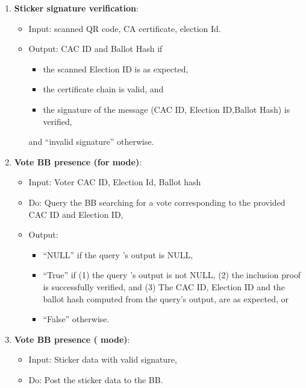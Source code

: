\documentclass{article}
\begin{document}
\begin{enumerate}
    \item \textbf{Sticker signature verification}:
\begin{itemize}
    \item Input: scanned QR code,  CA certificate, election Id.
    \item Output: CAC ID and Ballot Hash if 
    \begin{itemize}
        \item the scanned Election ID is as expected, 
        \item the certificate chain is valid, and
        \item the signature of the message (CAC ID, Election ID,Ballot Hash) is verified,
    \end{itemize}
    and ``invalid signature'' otherwise.
\end{itemize}
\label{Sticker signature verification}
    \item \textbf{Vote BB presence (for \BBInclusionCheck{} mode)}:

\begin{itemize}
    \item    Input: Voter CAC ID, Election Id, Ballot hash
    \item     Do: Query the BB  searching for a vote corresponding to the provided CAC ID and Election ID,
    \item Output: 
    \begin{itemize}
        \item ``NULL'' if the query 's output is NULL,
        \item ``True'' if (1) the query 's output is not NULL, (2) the inclusion proof is successfully verified, and
        (3) The CAC ID, Election ID and the ballot hash computed from the query's output, are as expected, or
        \item ``False'' otherwise.
    \end{itemize}


\end{itemize}
\label{Vote BB presence-BB Inc}
    \item \textbf{Vote BB presence (\StickerBBUpload{} mode)}:
\begin{itemize}
    \item Input: Sticker data with valid signature,
    \item Do: Post the sticker data to the BB.
\end{itemize}
\label{Vote BB presence-upload}


\end{enumerate}
\end{document}
